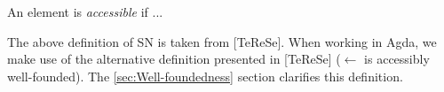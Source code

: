 \begin{definition}
  \label{d:WFacc}
  An element is \emph{accessible} if ...
\end{definition}





The above definition of SN is taken from [TeReSe].
When working in Agda, we make use of the alternative definition presented in [TeReSe] ($\leftarrow$ is accessibly well-founded).
The \ref{sec:Well-foundedness} section clarifies this definition.






